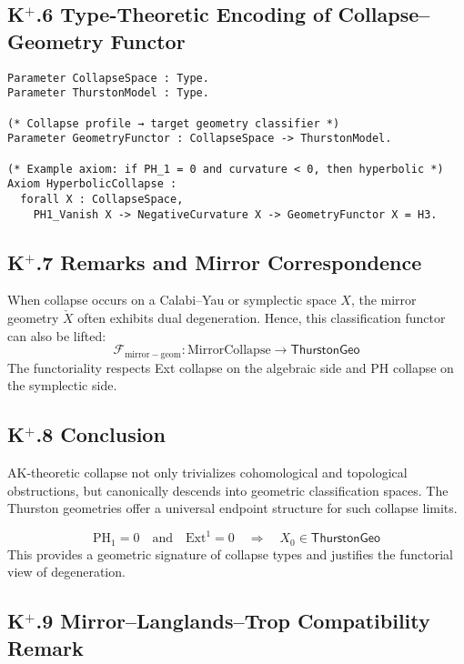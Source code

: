 \documentclass[11pt]{article}
\begin{document}
\begin{axiom}
\begin{axiom}
\subsection*{K$^+$.6 Type-Theoretic Encoding of Collapse–Geometry Functor}

\begin{lstlisting}[language=Coq]
Parameter CollapseSpace : Type.
Parameter ThurstonModel : Type.

(* Collapse profile → target geometry classifier *)
Parameter GeometryFunctor : CollapseSpace -> ThurstonModel.

(* Example axiom: if PH_1 = 0 and curvature < 0, then hyperbolic *)
Axiom HyperbolicCollapse :
  forall X : CollapseSpace,
    PH1_Vanish X -> NegativeCurvature X -> GeometryFunctor X = H3.
\end{lstlisting}

\subsection*{K$^+$.7 Remarks and Mirror Correspondence}

When collapse occurs on a Calabi–Yau or symplectic space \( X \), the mirror geometry \( \check{X} \) often  
exhibits dual degeneration. Hence, this classification functor can also be lifted:
\[
\mathcal{F}_{\mathrm{mirror-geom}} : \mathrm{MirrorCollapse} \to \mathsf{ThurstonGeo}
\]
The functoriality respects Ext collapse on the algebraic side and PH collapse on the symplectic side.

\subsection*{K$^+$.8 Conclusion}

AK-theoretic collapse not only trivializes cohomological and topological obstructions,  
but canonically descends into geometric classification spaces.  
The Thurston geometries offer a universal endpoint structure for such collapse limits.

\[
\boxed{
\mathrm{PH}_1 = 0 \quad \text{and} \quad \mathrm{Ext}^1 = 0 \quad \Rightarrow \quad X_0 \in \mathsf{ThurstonGeo}
}
\]
This provides a geometric signature of collapse types and justifies the functorial view of degeneration.

\subsection*{K$^+$.9 Mirror–Langlands–Trop Compatibility Remark}


\end{axiom}
\end{axiom}
\end{document}
